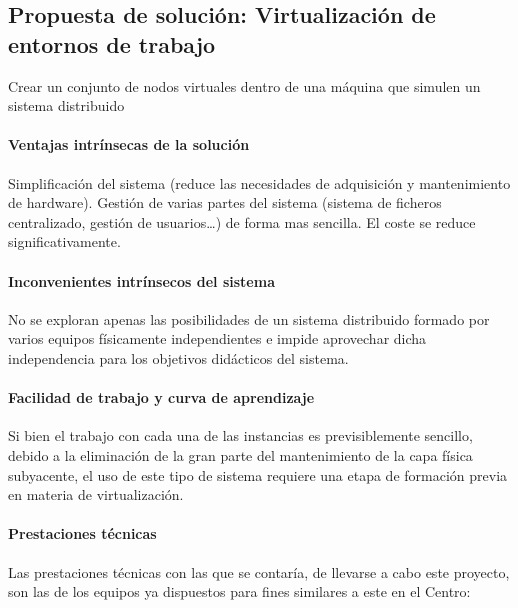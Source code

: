 \subsection{Propuesta de solución: Virtualización de entornos de trabajo}

Crear un conjunto de nodos virtuales dentro de una máquina que simulen un sistema distribuido

\paragraph{Ventajas intrínsecas de la solución\\}

Simplificación del sistema (reduce las necesidades de adquisición y mantenimiento de hardware).
Gestión de varias partes del sistema (sistema de ficheros centralizado, gestión de usuarios\dots) de forma mas sencilla. El coste se reduce significativamente.

\paragraph{Inconvenientes intrínsecos del sistema\\}

No se exploran apenas las posibilidades de un sistema distribuido formado por varios equipos físicamente independientes e impide aprovechar dicha independencia para los objetivos didácticos del sistema.

\paragraph{Facilidad de trabajo y curva de aprendizaje\\}

Si bien el trabajo con cada una de las instancias es previsiblemente sencillo, debido a la eliminación de la gran parte del mantenimiento de la capa física subyacente, el uso de este tipo de sistema requiere una etapa de formación previa en materia de virtualización.

\paragraph{Prestaciones técnicas\\}

Las prestaciones técnicas con las que se contaría, de llevarse a cabo este proyecto, son las de los equipos ya dispuestos para fines similares a este en el Centro\citationneeded[Andrés]{}: %

